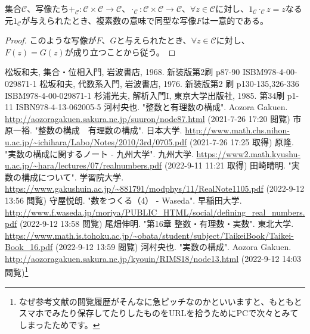 \documentclass[dvipdfmx]{jsarticle}
\begin{document}
\begin{thm}\label{1.2.6.49}
集合$\mathcal{C}$、写像たち$+_{\mathcal{C}}\mathcal{:C \times C \rightarrow C}$、$\cdot_{\mathcal{C}}\mathcal{:C \times C \rightarrow C}$、$\forall z \in \mathcal{C}$に対し、$1_{\mathcal{C}} \cdot_{\mathcal{C}}z = z$なる元$1_{\mathcal{C}}$が与えられたとき、複素数の意味で同型な写像$F$は一意的である。
\end{thm}
\begin{proof}
このような写像が$F$、$G$と与えられたとき、$\forall z \in \mathcal{C}$に対し、$F(z) = G(z)$が成り立つことから従う。
\end{proof}
\begin{thebibliography}{50}
  松坂和夫, 集合・位相入門, 岩波書店, 1968. 新装版第2刷 p87-90 ISBM978-4-00-029871-1
  松坂和夫, 代数系入門, 岩波書店, 1976. 新装版第2 刷 p130-135,326-336 ISBM978-4-00-029871-1
  杉浦光夫, 解析入門I, 東京大学出版社, 1985. 第34刷 p1-11 ISBN978-4-13-062005-5
  河村央也. "整数と有理数の構成". Aozora Gakuen. \url{http://aozoragakuen.sakura.ne.jp/suuron/node87.html}
  (2021-7-26 17:20 閲覧)
  市原一裕. "整数の構成　有理数の構成". 日本大学. \url{http://www.math.chs.nihon-u.ac.jp/~ichihara/Labo/Notes/2010/3rd/0705.pdf} (2021-7-26 17:25 取得)
  原隆. "実数の構成に関するノート - 九州大学". 九州大学. \url{https://www2.math.kyushu-u.ac.jp/~hara/lectures/07/realnumbers.pdf} (2022-9-11 11:21 取得)
  田崎晴明. "実数の構成について". 学習院大学. \url{https://www.gakushuin.ac.jp/~881791/modphys/11/RealNote1105.pdf} (2022-9-12 13:56 閲覧)
  守屋悦朗. "数をつくる（4） - Waseda". 早稲田大学. \url{http://www.f.waseda.jp/moriya/PUBLIC_HTML/social/defining_real_numbers.pdf} (2022-9-12 13:58 閲覧)
  尾畑伸明. "第16章 整数・有理数・実数". 東北大学. \url{https://www.math.is.tohoku.ac.jp/~obata/student/subject/TaikeiBook/Taikei-Book_16.pdf} (2022-9-12 13:59 閲覧)
  河村央也. "実数の構成". Aozora Gakuen. \url{http://aozoragakuen.sakura.ne.jp/kyouin/RIMS18/node13.html} (2022-9-12 14:03 閲覧)\footnote{なぜ参考文献の閲覧履歴がそんなに急ピッチなのかといいますと、もともとスマホでみたり保存してたりしたものをURLを拾うためにPCで次々とみてしまったためです。}
\end{thebibliography}
\end{document}
